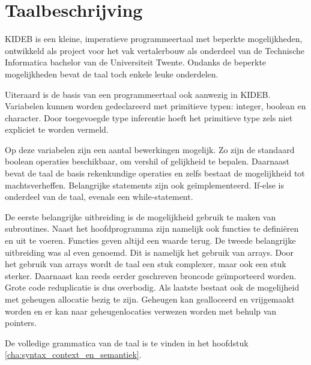 \chapter{Taalbeschrijving} %
\label{cha:taalbeschrijving}
KIDEB is een kleine, imperatieve programmeertaal met beperkte mogelijkheden, ontwikkeld als project voor het vak vertalerbouw als onderdeel van de Technische Informatica bachelor van de Universiteit Twente. Ondanks de beperkte mogelijkheden bevat de taal toch enkele leuke onderdelen.

Uiteraard is de basis van een programmeertaal ook aanwezig in KIDEB. Variabelen kunnen worden gedeclareerd met primitieve typen: integer, boolean en character. Door toegevoegde type inferentie hoeft het primitieve type zels niet expliciet te worden vermeld. 

Op deze variabelen zijn een aantal bewerkingen mogelijk. Zo zijn de standaard boolean operaties beschikbaar, om vershil of gelijkheid te bepalen. Daarnaast bevat de taal de basis rekenkundige operaties en zelfs bestaat de mogelijkheid tot machtsverheffen. Belangrijke statements zijn ook ge\"implementeerd. If-else is onderdeel van de taal, evenals een while-statement. 

De eerste belangrijke uitbreiding is de mogelijkheid gebruik te maken van subroutines. Naast het hoofdprogramma zijn namelijk ook functies te defini\"eren en uit te voeren. Functies geven altijd een waarde terug. 
De tweede belangrijke uitbreiding was al even genoemd. Dit is namelijk het gebruik van arrays. Door het gebruik van arrays wordt de taal een stuk complexer, maar ook een stuk sterker.
Daarnaast kan reeds eerder geschreven broncode ge\"importeerd worden. Grote code reduplicatie is dus overbodig.
Als laatste bestaat ook de mogelijheid met geheugen allocatie bezig te zijn. Geheugen kan gealloceerd en vrijgemaakt worden en er kan naar geheugenlocaties verwezen worden met behulp van pointers.

De volledige grammatica van de taal is te vinden in het hoofdstuk \ref{cha:syntax_context_en_semantiek}.

\clearpage